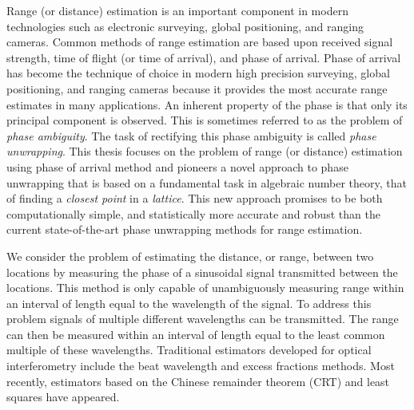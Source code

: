  \label{Summary}
%

Range (or distance) estimation is an important component in modern technologies such as electronic surveying, global positioning, and ranging cameras. Common methods of range estimation are based upon received signal strength, time of flight (or time of arrival), and phase of arrival. Phase of arrival has become the technique of choice in modern high precision surveying, global positioning, and ranging cameras because it provides the most accurate range estimates in many applications. An inherent property of the phase is that only its principal component is observed. This is sometimes referred to as the problem of \emph{phase ambiguity}. The task of rectifying this phase ambiguity is called \emph{phase unwrapping}. This thesis focuses on the problem of range (or distance) estimation using phase of arrival method and pioneers a novel approach to phase unwrapping that is based on a fundamental task in algebraic number theory, that of finding a \emph{closest point} in a \emph{lattice}. This new approach promises to be both computationally simple, and statistically more accurate and robust than the current state-of-the-art phase unwrapping methods for range estimation.
 
We consider the problem of estimating the distance, or range, between two locations by measuring the phase of a sinusoidal signal transmitted between the locations. This method is only capable of unambiguously measuring range within an interval of length equal to the wavelength of the signal. To address this problem signals of multiple different wavelengths can be transmitted.  The range can then be measured within an interval of length equal to the least common multiple of these wavelengths. Traditional estimators developed for optical interferometry include the beat wavelength and excess fractions methods.  Most recently, estimators based on the Chinese remainder theorem (CRT) and least squares have appeared.

